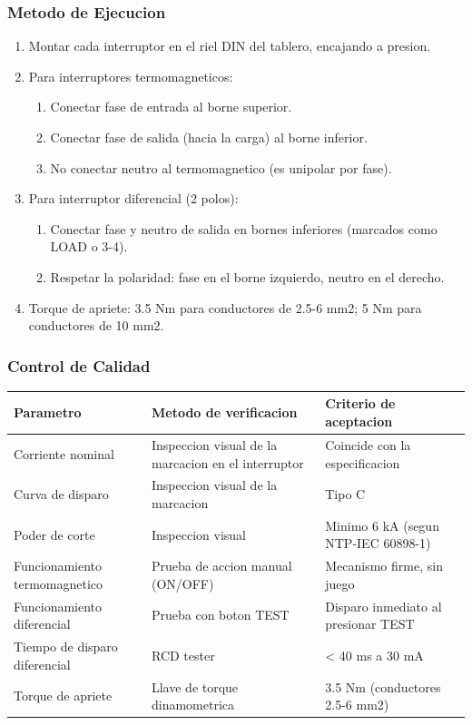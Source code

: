 \subsubsection{Metodo de Ejecucion}

\begin{enumerate}
  \item Montar cada interruptor en el riel DIN del tablero, encajando a presion.
  \item Para interruptores termomagneticos:
  \begin{enumerate}
    \item Conectar fase de entrada al borne superior.
    \item Conectar fase de salida (hacia la carga) al borne inferior.
    \item No conectar neutro al termomagnetico (es unipolar por fase).
  \end{enumerate}
  \item Para interruptor diferencial (2 polos):
  \begin{enumerate}
    \iente Conectar fase y neutro de entrada en bornes superiores (marcados como LINE o 1-2).
    \item Conectar fase y neutro de salida en bornes inferiores (marcados como LOAD o 3-4).
    \item Respetar la polaridad: fase en el borne izquierdo, neutro en el derecho.
  \end{enumerate}
  \item Torque de apriete: 3.5 Nm para conductores de 2.5-6 mm2; 5 Nm para conductores de 10 mm2.
\end{enumerate}

\subsubsection{Control de Calidad}

\begin{longtable}{L{4.5cm} L{4.5cm} L{4.5cm}}
\toprule
\textbf{Parametro} & \textbf{Metodo de verificacion} & \textbf{Criterio de aceptacion} \\
\midrule
Corriente nominal & Inspeccion visual de la marcacion en el interruptor & Coincide con la especificacion \\
Curva de disparo & Inspeccion visual de la marcacion & Tipo C \\
Poder de corte & Inspeccion visual & Minimo 6 kA (segun NTP-IEC 60898-1) \\
Funcionamiento termomagnetico & Prueba de accion manual (ON/OFF) & Mecanismo firme, sin juego \\
Funcionamiento diferencial & Prueba con boton TEST & Disparo inmediato al presionar TEST \\
Tiempo de disparo diferencial & RCD tester & < 40 ms a 30 mA \\
Torque de apriete & Llave de torque dinamometrica & 3.5 Nm (conductores 2.5-6 mm2) \\
\bottomrule
\end{longtable}

